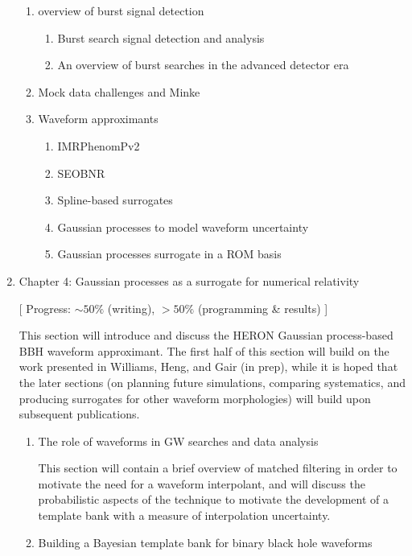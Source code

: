 \documentclass{kentigern}
\theoremstyle{definition}
\begin{document}
\begin{enumerate}
\begin{enumerate}
  \item overview of burst signal detection
    \begin{enumerate}
    \item Burst search signal detection and analysis
    \item An overview of burst searches in the advanced detector era
    \end{enumerate}
    
  \item Mock data challenges and Minke
  \item Waveform approximants
    \begin{enumerate}
    \item IMRPhenomPv2   
    \item SEOBNR
    \item Spline-based surrogates
    \item Gaussian processes to model waveform uncertainty
    \item Gaussian processes surrogate in a ROM basis
    \end{enumerate}
  \end{enumerate}
\item Chapter 4: Gaussian processes as a surrogate for numerical relativity
  
  [ Progress: $\sim 50\%$ (writing), $>50\%$  (programming \& results) ]

  This
    section will introduce and discuss the HERON Gaussian
    process-based BBH waveform approximant. The first half of this
    section will build on the work presented in Williams, Heng, and
    Gair (in prep), while it is hoped that the later sections (on
    planning future simulations, comparing systematics, and producing
    surrogates for other waveform morphologies) will build upon
    subsequent publications.

    \begin{enumerate}
    
    \item The role of waveforms in GW searches and data analysis
      
   This section will contain a brief overview of matched filtering in
   order to motivate the need for a waveform interpolant, and will
   discuss the probabilistic aspects of the technique to motivate the
   development of a template bank with a measure of interpolation
   uncertainty.   
 \item Building a Bayesian template bank for binary black hole waveforms
   

\end{enumerate}
\end{enumerate}
\end{document}
